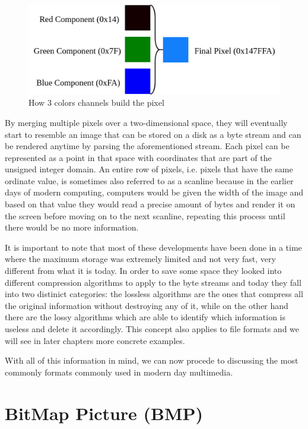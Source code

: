 \begin{figure}[H]
    \centering
    \includegraphics[width=12.5cm,keepaspectratio]{pics/how_a_pixel_works}
    \caption{How 3 colors channels build the pixel}
    \label{Pixel Creation}
\end{figure}

By merging multiple pixels over a two-dimensional space, they will eventually start to resemble an image that can be stored on a disk as a byte stream and can be rendered anytime by parsing the aforementioned stream. Each pixel can be represented as a point in that space with coordinates that are part of the unsigned integer domain. An entire row of pixels, i.e. pixels that have the same ordinate value, is sometimes also referred to as a scanline because in the earlier days of modern computing, computers would be given the width of the image and based on that value they would read a precise amount of bytes and render it on the screen before moving on to the next scanline, repeating this process until there would be no more information.

It is important to note that most of these developments have been done in a time where the maximum storage was extremely limited and not very fast, very different from what it is today. In order to save some space they looked into different compression algorithms to apply to the byte streams and today they fall into two distinict categories: the lossless algorithms are the ones that compress all the original information without destroying any of it, while on the other hand there are the lossy algorithms which are able to identify which information is useless and delete it accordingly. This concept also applies to file formats and we will see in later chapters more concrete examples. 

With all of this information in mind, we can now procede to discussing the most commonly formats commonly used in modern day multimedia.

\section{BitMap Picture (BMP)} \label{BMP_Explained_Chapter}

